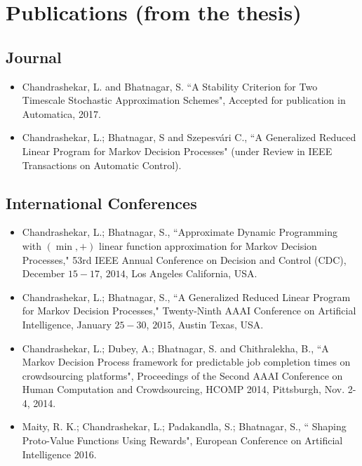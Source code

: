 \documentclass[onecolumn,12pt]{IEEEtran}
\begin{document}
\begin{comment}
Solving MDPs typically involves computing the optimal value function and the optimal policy. However, most MDPs arising in practice have a large number of states and it is difficult to compute the optimal value function/policy. Approximate Dynamic Programming deal MDPs with large number of states by computing an approximate value function and a sub-optimal policy. The most widely used approach by ADP methods is linear function approximation wherein the value function is restricted to a subspace spanned by a set of basis functions.\par
Approximate Linear Programming (ALP) method has guaranteed performance for the sub-optimal policy it computes. A significant shortcoming of the ALP is that the number of constraints are large in the case MDPs with large number of states. In the thesis, we introduce the Generalized Reduced Linear Program
\end{comment}
\section{Publications (from the thesis)}
\subsection{Journal}
\begin{itemize}
\item Chandrashekar, L. and  Bhatnagar, S. ``A Stability Criterion for Two Timescale Stochastic Approximation Schemes", Accepted for publication in Automatica, 2017.
\item Chandrashekar, L.;  Bhatnagar, S and Szepesv\'{a}ri C., ``A Generalized Reduced Linear Program for Markov Decision Processes" (under Review in IEEE Transactions on Automatic Control).
\end{itemize}
\subsection{International Conferences}
\begin{itemize}
\item Chandrashekar, L.; Bhatnagar, S., ``Approximate Dynamic Programming with $(\min,+)$ linear function approximation for Markov Decision Processes," 53rd IEEE Annual Conference on Decision and Control (CDC), December $15-17$, $2014$, Los Angeles California, USA.
\item Chandrashekar, L.; Bhatnagar, S., ``A Generalized Reduced Linear Program for Markov Decision Processes," Twenty-Ninth AAAI Conference on Artificial Intelligence, January $25-30$, $2015$, Austin Texas, USA.
\item Chandrashekar, L.;  Dubey, A.; Bhatnagar, S. and Chithralekha, B., ``A Markov Decision Process framework for predictable job completion times on crowdsourcing platforms", Proceedings of the Second {AAAI} Conference on Human Computation and Crowdsourcing, {HCOMP} 2014, Pittsburgh, Nov. 2-4, 2014.
\item Maity, R. K.; Chandrashekar, L.;  Padakandla, S.; Bhatnagar, S., ``
Shaping Proto-Value Functions Using Rewards", European Conference on Artificial Intelligence 2016.
\end{itemize}




\end{document}
